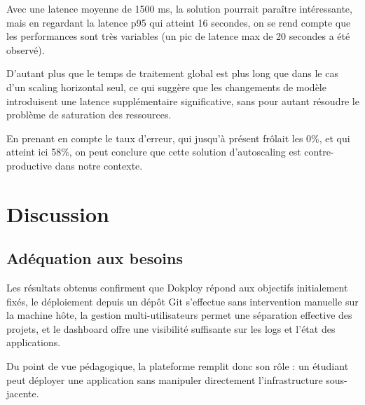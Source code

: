 \documentclass{rapportClass} %
\begin{document}
Avec une latence moyenne de 1500 ms, la solution pourrait paraître intéressante, mais en regardant la latence p95 qui 
atteint 16 secondes, on se rend compte que les performances sont très variables (un pic de latence max de 20 secondes a été observé).

D'autant plus que le temps de traitement global est plus long que dans le cas d'un scaling horizontal seul, 
ce qui suggère que les changements de modèle introduisent une latence supplémentaire significative,
sans pour autant résoudre le problème de saturation des ressources.

En prenant en compte le taux d'erreur, qui jusqu'à présent frôlait les 0\%, et qui atteint ici 58\%, 
on peut conclure que cette solution d'autoscaling est contre-productive dans notre contexte.




\section{Discussion}
\label{sec:discussion}
\subsection{Adéquation aux besoins}
Les résultats obtenus confirment que Dokploy répond aux objectifs initialement fixés,
le déploiement depuis un dépôt Git s'effectue sans intervention manuelle sur la machine hôte, 
la gestion multi-utilisateurs permet une séparation effective des projets, 
et le dashboard offre une visibilité suffisante sur les logs et l'état des applications. 

\smallskip
Du point de vue pédagogique, la plateforme remplit donc son rôle : un étudiant peut déployer 
une application sans manipuler directement l'infrastructure sous-jacente.
\end{document}
